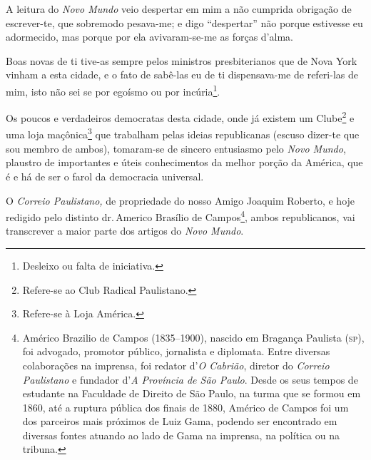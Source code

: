 A leitura do \emph{Novo Mundo} veio despertar em mim a não cumprida
obrigação de escrever-te, que sobremodo pesava-me; e digo ``despertar''
não porque estivesse eu adormecido, mas porque por ela avivaram-se-me as
forças d'alma.

Boas novas de ti tive-as sempre pelos ministros presbiterianos que de
Nova York vinham a esta cidade, e o fato de sabê-las eu de ti
dispensava-me de referi-las de mim, isto não sei se por egoísmo ou por
incúria\footnote{ Desleixo ou falta de iniciativa.}.

Os poucos e verdadeiros democratas desta cidade, onde já existem um
Clube\footnote{ Refere-se ao Club Radical Paulistano.} e uma loja
maçônica\footnote{ Refere-se à Loja América.} que trabalham pelas
ideias republicanas (escuso dizer-te que sou membro de ambos),
tomaram-se de sincero entusiasmo pelo \emph{Novo Mundo}, plaustro de
importantes e úteis conhecimentos da melhor porção da América, que é e
há de ser o farol da democracia universal.

O \emph{Correio Paulistano,} de propriedade do nosso Amigo Joaquim
Roberto, e hoje redigido pelo distinto dr.\,Americo Brasílio de
Campos\footnote{ Américo Brazilio de Campos (1835--1900), nascido em
  Bragança Paulista (\textsc{sp}), foi advogado, promotor público, jornalista e
  diplomata. Entre diversas colaborações na imprensa, foi redator
  d'\emph{O Cabrião}, diretor do \emph{Correio Paulistano} e fundador
  d'\emph{A Província de São Paulo}. Desde os seus tempos de estudante
  na Faculdade de Direito de São Paulo, na turma que se formou em 1860,
  até a ruptura pública dos finais de 1880, Américo de Campos foi um dos
  parceiros mais próximos de Luiz Gama, podendo ser encontrado em
  diversas fontes atuando ao lado de Gama na imprensa, na política ou na
  tribuna.}, ambos republicanos, vai transcrever a maior parte dos
artigos do \emph{Novo Mundo}.

